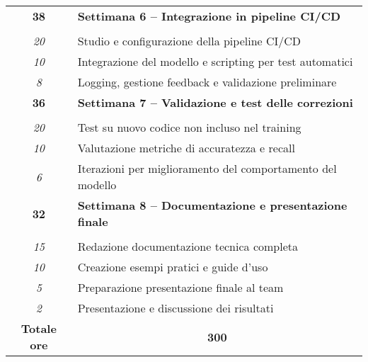\begin{tabularx}{\textwidth}{|c|X|}
\textbf{38} & \textbf{Settimana 6 – Integrazione in pipeline CI/CD} \\ \hdashline
\multirow{3}{0cm}\\
\textit{20} & Studio e configurazione della pipeline CI/CD \\
\textit{10} & Integrazione del modello e scripting per test automatici \\
\textit{8} & Logging, gestione feedback e validazione preliminare \\
\hline

\textbf{36} & \textbf{Settimana 7 – Validazione e test delle correzioni} \\ \hdashline
\multirow{3}{0cm}\\
\textit{20} & Test su nuovo codice non incluso nel training \\
\textit{10} & Valutazione metriche di accuratezza e recall \\
\textit{6} & Iterazioni per miglioramento del comportamento del modello \\
\hline

\textbf{32} & \textbf{Settimana 8 – Documentazione e presentazione finale} \\ \hdashline
\multirow{4}{0cm}\\
\textit{15} & Redazione documentazione tecnica completa \\
\textit{10} & Creazione esempi pratici e guide d’uso \\
\textit{5} & Preparazione presentazione finale al team \\
\textit{2} & Presentazione e discussione dei risultati \\
\hline

\textbf{Totale ore} & \multicolumn{1}{|c|}{\textbf{300}} \\
\hline
	
\end{tabularx}